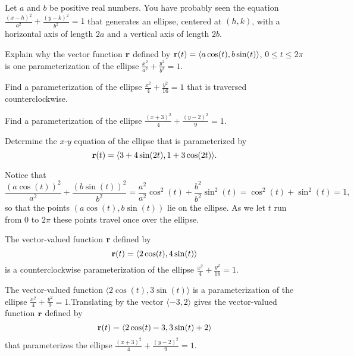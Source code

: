 \begin{exercises}
\begin{exerciseSolution}
\ea
\end{exerciseSolution}

\item \label{Ez:9.6.2}   Let $a$ and $b$ be positive real numbers.  You have probably seen the equation $\frac{(x-h)^2}{a^2} + \frac{(y-k)^2}{b^2} = 1$ that generates an ellipse, centered at $(h,k)$, with a horizontal axis of length $2a$ and a vertical axis of length $2b$.
\ba
	\item Explain why the vector function $\mathbf{r}$ defined by $\mathbf{r}(t) = \langle a\cos(t), b\sin(t) \rangle$, $0 \le t \le 2\pi$ is one parameterization of the ellipse $\frac{x^2}{a^2} + \frac{y^2}{b^2} = 1$.

	\item Find a parameterization of the ellipse $\frac{x^2}{4} + \frac{y^2}{16} = 1$ that is traversed counterclockwise.
	
	\item Find a parameterization of the ellipse $\frac{(x+3)^2}{4} + \frac{(y-2)^2}{9} = 1$.
	
	\item Determine the $x$-$y$ equation of the ellipse that is parameterized by $$\mathbf{r}(t) = \langle 3 + 4\sin(2t), 1 + 3\cos(2t) \rangle.$$
\ea




\begin{exerciseSolution}
\ba
	\item Notice that 
\[\frac{(a\cos(t))^2}{a^2} + \frac{(b\sin(t))^2}{b^2} = \frac{a^2}{a^2} \cos^2(t) + \frac{b^2}{b^2}\sin^2(t) = \cos^2(t)+\sin^2(t) = 1,\]
so that the points $(a\cos(t), b\sin(t))$ lie on the ellipse. As we let $t$ run from 0 to $2 \pi$ these points travel once over the ellipse.

	\item The vector-valued function $\mathbf{r}$ defined by 
\[\mathbf{r}(t) = \langle 2\cos(t), 4\sin(t) \rangle\]
is a counterclockwise parameterization of the ellipse $\frac{x^2}{4} + \frac{y^2}{16} = 1$.
	
	\item The vector-valued function $\langle 2\cos(t), 3\sin(t) \rangle$ is a parameterization of the ellipse $\frac{x^2}{4} + \frac{y^2}{9} = 1$.Translating by the vector $\langle -3,2 \rangle$ gives the vector-valued function $\mathbf{r}$ defined by 
\[\mathbf{r}(t) = \langle 2\cos(t)-3, 3\sin(t)+2 \rangle\]
that parameterizes the ellipse $\frac{(x+3)^2}{4} + \frac{(y-2)^2}{9} = 1$. 
	

\end{exerciseSolution}
\end{exercises}

